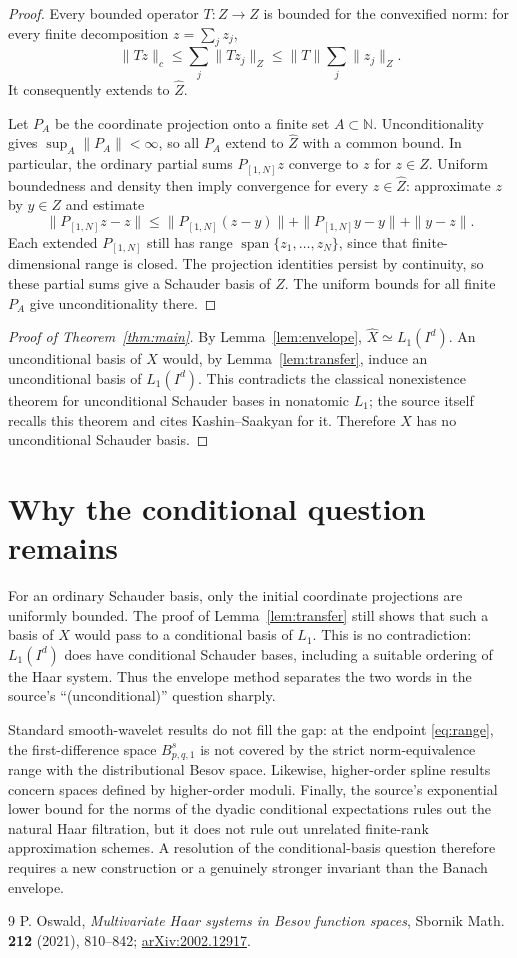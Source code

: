 \documentclass[10pt]{article}
\begin{document}
\begin{proof}
Every bounded operator $T:Z\to Z$ is bounded for the convexified norm:
for every finite decomposition $z=\sum_jz_j$,
\[
 \|Tz\|_c\leq\sum_j\|Tz_j\|_Z
 \leq\|T\|\sum_j\|z_j\|_Z.
\]
It consequently extends to $\widehat Z$.

Let $P_A$ be the coordinate projection onto a finite set
$A\subset\mathbb N$.  Unconditionality gives
$\sup_A\|P_A\|<\infty$, so all $P_A$ extend to $\widehat Z$ with a common
bound.  In particular, the ordinary partial sums $P_{[1,N]}z$ converge to
$z$ for $z\in Z$.  Uniform boundedness and density then imply convergence
for every $z\in\widehat Z$: approximate $z$ by $y\in Z$ and estimate
\[
 \|P_{[1,N]}z-z\|
 \leq \|P_{[1,N]}(z-y)\|+
 \|P_{[1,N]}y-y\|+\|y-z\|.
\]
Each extended $P_{[1,N]}$ still has range
$\operatorname{span}\{z_1,\ldots,z_N\}$, since that finite-dimensional
range is closed.  The projection identities persist by continuity, so these
partial sums give a Schauder basis of $\widehat Z$.  The uniform bounds for
all finite $P_A$ give unconditionality there.
\end{proof}

\begin{proof}[Proof of Theorem~\ref{thm:main}]
By Lemma~\ref{lem:envelope}, $\widehat X\simeq L_1(I^d)$.  An unconditional
basis of $X$ would, by Lemma~\ref{lem:transfer}, induce an unconditional
basis of $L_1(I^d)$.  This contradicts the classical nonexistence theorem
for unconditional Schauder bases in nonatomic $L_1$; the source itself
recalls this theorem and cites Kashin--Saakyan for it.  Therefore $X$ has no
unconditional Schauder basis.
\end{proof}

\section{Why the conditional question remains}

For an ordinary Schauder basis, only the initial coordinate projections are
uniformly bounded.  The proof of Lemma~\ref{lem:transfer} still shows that
such a basis of $X$ would pass to a conditional basis of $L_1$.  This is no
contradiction: $L_1(I^d)$ does have conditional Schauder bases, including a
suitable ordering of the Haar system.  Thus the envelope method separates
the two words in the source's ``(unconditional)'' question sharply.

Standard smooth-wavelet results do not fill the gap: at the endpoint
\eqref{eq:range},
the first-difference space $B^s_{p,q,1}$ is not covered by the strict
norm-equivalence range with the distributional Besov space.  Likewise,
higher-order spline results concern spaces defined by higher-order moduli.
Finally, the source's exponential lower bound for the norms of the dyadic
conditional expectations rules out the natural Haar filtration, but it
does not rule out unrelated finite-rank approximation schemes.  A resolution
of the conditional-basis question therefore requires a new construction or
a genuinely stronger invariant than the Banach envelope.

\begin{thebibliography}{9}
P. Oswald,
\emph{Multivariate Haar systems in Besov function spaces},
Sbornik Math. \textbf{212} (2021), 810--842;
\href{https://arxiv.org/abs/2002.12917}{arXiv:2002.12917}.
\end{thebibliography}
\end{document}
